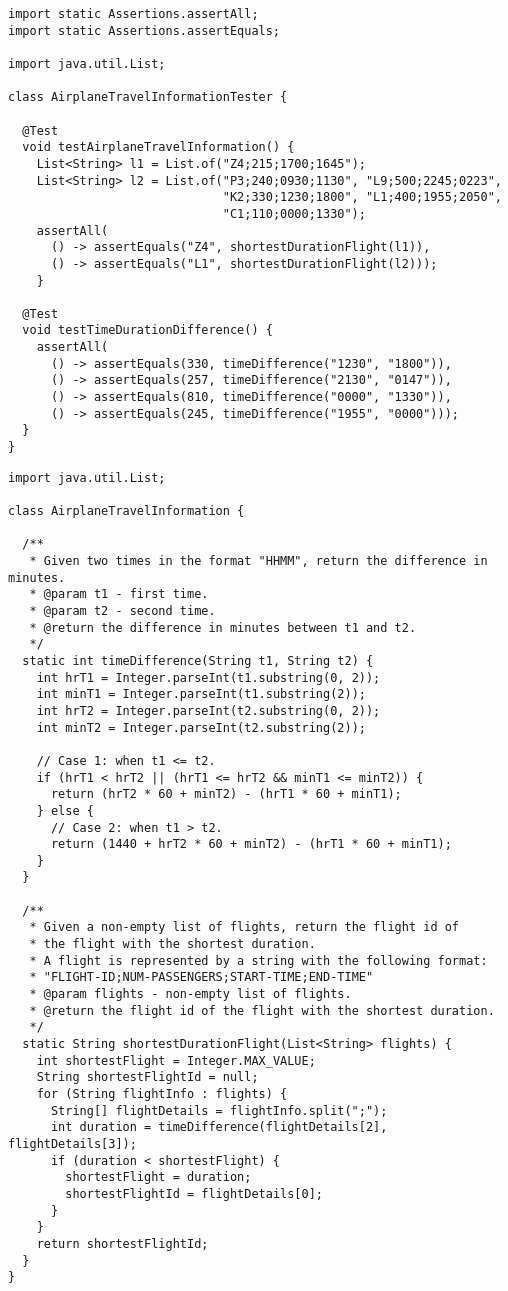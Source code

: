 \begin{lstlisting}[language=MyJava]
import static Assertions.assertAll;
import static Assertions.assertEquals;

import java.util.List;

class AirplaneTravelInformationTester {

  @Test
  void testAirplaneTravelInformation() {
    List<String> l1 = List.of("Z4;215;1700;1645");
    List<String> l2 = List.of("P3;240;0930;1130", "L9;500;2245;0223",
                              "K2;330;1230;1800", "L1;400;1955;2050",
                              "C1;110;0000;1330");
    assertAll(
      () -> assertEquals("Z4", shortestDurationFlight(l1)),
      () -> assertEquals("L1", shortestDurationFlight(l2)));
    }

  @Test
  void testTimeDurationDifference() {
    assertAll(
      () -> assertEquals(330, timeDifference("1230", "1800")),
      () -> assertEquals(257, timeDifference("2130", "0147")),
      () -> assertEquals(810, timeDifference("0000", "1330")),
      () -> assertEquals(245, timeDifference("1955", "0000")));
  }
}
\end{lstlisting}

\begin{lstlisting}[language=MyJava]
import java.util.List;

class AirplaneTravelInformation {

  /**
   * Given two times in the format "HHMM", return the difference in minutes.
   * @param t1 - first time.
   * @param t2 - second time.
   * @return the difference in minutes between t1 and t2.
   */
  static int timeDifference(String t1, String t2) {
    int hrT1 = Integer.parseInt(t1.substring(0, 2));
    int minT1 = Integer.parseInt(t1.substring(2));
    int hrT2 = Integer.parseInt(t2.substring(0, 2));
    int minT2 = Integer.parseInt(t2.substring(2));

    // Case 1: when t1 <= t2.
    if (hrT1 < hrT2 || (hrT1 <= hrT2 && minT1 <= minT2)) {
      return (hrT2 * 60 + minT2) - (hrT1 * 60 + minT1);
    } else {
      // Case 2: when t1 > t2.
      return (1440 + hrT2 * 60 + minT2) - (hrT1 * 60 + minT1);
    }
  }

  /**
   * Given a non-empty list of flights, return the flight id of
   * the flight with the shortest duration.
   * A flight is represented by a string with the following format:
   * "FLIGHT-ID;NUM-PASSENGERS;START-TIME;END-TIME"
   * @param flights - non-empty list of flights.
   * @return the flight id of the flight with the shortest duration.
   */
  static String shortestDurationFlight(List<String> flights) {
    int shortestFlight = Integer.MAX_VALUE;
    String shortestFlightId = null;
    for (String flightInfo : flights) {
      String[] flightDetails = flightInfo.split(";");
      int duration = timeDifference(flightDetails[2], flightDetails[3]);
      if (duration < shortestFlight) {
        shortestFlight = duration;
        shortestFlightId = flightDetails[0];
      }
    }
    return shortestFlightId;
  }
}
\end{lstlisting}

